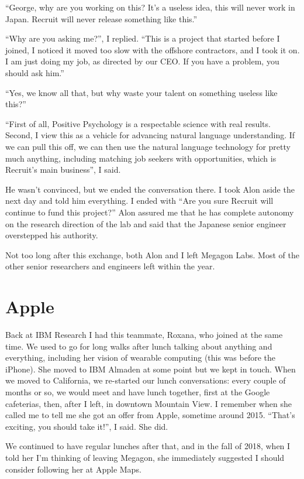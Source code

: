 \documentclass[12pt]{book}
\begin{document}
``George, why are you working on this? It's a useless idea, this will
never work in Japan. Recruit will never release something like this.''

``Why are you asking me?'', I replied. ``This is a project that started
before I joined, I noticed it moved too slow with the offshore
contractors, and I took it on. I am just doing my job, as directed by
our CEO. If you have a problem, you should ask him.''

``Yes, we know all that, but why waste your talent on something useless
like this?''

``First of all, Positive Psychology is a respectable science with real
results. Second, I view this as a vehicle for advancing natural language
understanding. If we can pull this off, we can then use the natural
language technology for pretty much anything, including matching job
seekers with opportunities, which is Recruit's main business'', I said.

He wasn't convinced, but we ended the conversation there. I took Alon
aside the next day and told him everything. I ended with ``Are you sure
Recruit will continue to fund this project?'' Alon assured me that he
has complete autonomy on the research direction of the lab and said that
the Japanese senior engineer overstepped his authority.

Not too long after this exchange, both Alon and I left Megagon Labs.
Most of the other senior researchers and engineers left within the year.


\section{Apple}

Back at IBM Research I had this teammate, Roxana, who joined at the same
time. We used to go for long walks after lunch talking about anything
and everything, including her vision of wearable computing (this was
before the iPhone). She moved to IBM Almaden at some point but we kept
in touch. When we moved to California, we re-started our lunch
conversations: every couple of months or so, we would meet and have
lunch together, first at the Google cafeterias, then, after I left, in
downtown Mountain View. I remember when she called me to tell me she got
an offer from Apple, sometime around 2015. ``That's exciting, you should
take it!'', I said. She did.

We continued to have regular lunches after that, and in the fall of
2018, when I told her I'm thinking of leaving Megagon, she immediately
suggested I should consider following her at Apple Maps.
\end{document}
